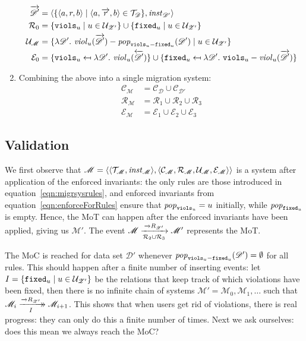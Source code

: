 \documentclass[runningheads]{llncs}
\newcommand{\xrightarrowdbl}[2][]{%
  \xrightarrow[#1]{#2}\mathrel{\mkern-14mu}\rightarrow
}
\newcommand{\id}[1]{\text{\it #1\/}}
\newcommand{\popF}[1]{\id{pop}_{#1}}
\newcommand{\pop}[2]{\popF{#1}(#2)}
\newcommand{\instance}{\mathbin{\id{inst}}}
\newcommand{\viol}[2]{\violC{#1}(#2)}
\newcommand{\violC}[1]{\id{viol}_{#1}}
\newcommand{\pair}[2]{\langle{#1},{#2}\rangle}
\newcommand{\triple}[3]{\langle{#1},{#2},{#3}\rangle}
\newcommand{\quadruple}[4]{\langle{#1},{#2},{#3},{#4}\rangle}
\newcommand{\concepts}{\mathcal{C}}
\newcommand{\rels}{\mathcal{R}}   %
\newcommand{\triples}{\mathcal{T}}
\newcommand{\enforces}{\mathcal{E}}
\newcommand{\rules}{\mathcal{U}}
\newcommand{\dataset}{\mathscr{D}}
\newcommand{\schema}{\mathscr{Z}}
\newcommand{\migrsys}{\mathscr{M}}
\begin{document}
\begin{enumerate}
\begin{align}
   \overrightarrow{\dataset'} &= \pair{\{\triple{a}{{r}}{b} \mid \triple{a}{\overrightarrow{r}}{b}\in\triples_\dataset\}}{\instance_{\dataset'}} \\
   \rels_\theenumi &= \{{\tt viols}_u\mid u \in \rules_{\schema'}\} \cup \{{\tt fixed}_u\mid u \in \rules_{\schema'}\}\\
   \rules_\migrsys &= \{\lambda {\dataset'}.~ \viol{u}{\overrightarrow{\dataset'}} - \pop{{\tt viols}_u - {\tt fixed}_u}{\dataset'} \mid u\in\rules_{\schema'}\}\label{eqn:migrsysrules}\\
   \enforces_{\theenumi} &=\{{\tt viols}_u \mapsfrom \lambda \dataset'.~ \viol{u}{\overleftarrow{\dataset'}}\} \cup
    \{{\tt fixed}_u \mapsfrom \lambda \dataset'.~ {\tt viols}_u - \viol{u}{\overrightarrow{\dataset'}}\}\label{eqn:enforceForRules}
   \end{align}
\item Combining the above into a single migration system:
   \begin{align}
   \concepts_\migrsys &= \concepts_\dataset \cup  \concepts_{\dataset'}\\
   \rels_\migrsys &= \rels_1\cup\rels_2\cup \rels_3\\
   \enforces_\migrsys &= \enforces_1\cup\enforces_2\cup\enforces_3
   \end{align}
\end{enumerate}
   
\subsection{Validation}
   We first observe that $\migrsys = \pair{\pair{\triples_\migrsys}{\instance_\migrsys}}{\quadruple{\concepts_\migrsys}{\rels_\migrsys}{\rules_\migrsys}{\enforces_\migrsys}}$ is a system after application of the enforced invariants:
   the only rules are those introduced in equation~\ref{eqn:migrsysrules}, and enforced invariants from equation~\ref{eqn:enforceForRules} ensure that $\popF{{\tt viols}_u} = u$ initially, while $\popF{{\tt fixed}_u}$ is empty.
   Hence, the MoT can happen after the enforced invariants have been applied, giving us $\migrsys'$.
   The event $\migrsys \xrightarrow[\rels_2 \cup \rels_3]{\overrightarrow\rels_{\schema'}}\migrsys'$ represents the MoT.
   
   The MoC is reached for data set $\dataset'$ whenever $\pop{{\tt viols}_u - {\tt fixed}_u}{\dataset'}=\emptyset$ for all rules.
   This should happen after a finite number of inserting events: let $I = \{{\tt fixed}_u \mid u\in\rules_{\schema'}\}$ be the relations that keep track of which violations have been fixed, then there is no infinite chain of systems $\migrsys' = \migrsys_0, \migrsys_1,\ldots$ such that $\migrsys_i\xrightarrowdbl[I]{\overrightarrow\rels_{\schema'}}\migrsys_{i+1}$.
   This shows that when users get rid of violations, there is real progress: they can only do this a finite number of times.
   Next we ask ourselves: does this mean we always reach the MoC?
   
\end{document}
